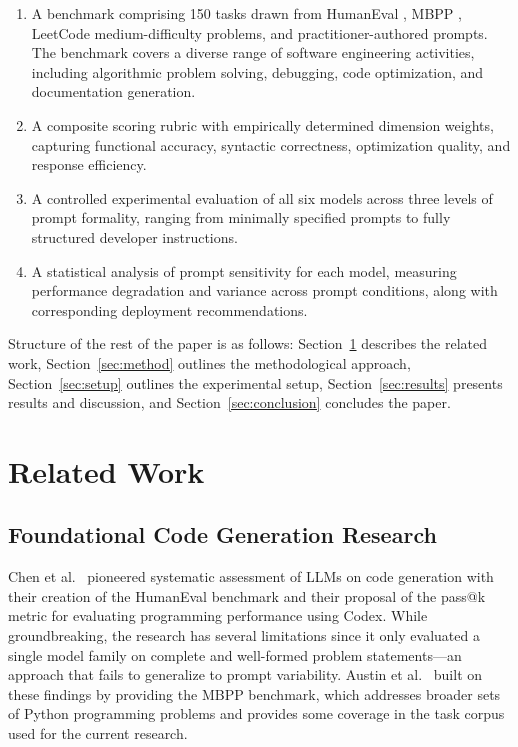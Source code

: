 \documentclass[conference]{IEEEtran}
\begin{document}
\begin{enumerate}
    \item A benchmark comprising 150 tasks drawn from HumanEval \cite{chen2021codex}, MBPP \cite{austin2021mbpp}, LeetCode medium-difficulty problems, and practitioner-authored prompts. The benchmark covers a diverse range of software engineering activities, including algorithmic problem solving, debugging, code optimization, and documentation generation.

    \item A composite scoring rubric with empirically determined dimension weights, capturing functional accuracy, syntactic correctness, optimization quality, and response efficiency.

    \item A controlled experimental evaluation of all six models across three levels of prompt formality, ranging from minimally specified prompts to fully structured developer instructions.

    \item A statistical analysis of prompt sensitivity for each model, measuring performance degradation and variance across prompt conditions, along with corresponding deployment recommendations.
\end{enumerate}

Structure of the rest of the paper is as follows: Section~\ref{sec:related} 
describes the related work, Section~\ref{sec:method} outlines the methodological approach, Section~\ref{sec:setup} outlines the experimental setup, Section~\ref{sec:results} presents results and discussion, and Section~\ref{sec:conclusion} concludes the paper.

\section{Related Work}
\label{sec:related}

\subsection{Foundational Code Generation Research}

Chen et al.\ \cite{chen2021codex} pioneered systematic assessment of LLMs on code generation with their creation of the HumanEval benchmark and their proposal of the pass@k metric for evaluating programming performance using Codex. While groundbreaking, the research has several limitations since it only evaluated a single model family on complete and well-formed problem statements—an approach that fails to generalize to prompt variability. Austin et al.\ \cite{austin2021mbpp} built on these findings by providing the MBPP benchmark, which addresses broader sets of Python programming problems and provides some coverage in the task corpus used for the current research.
\end{document}
